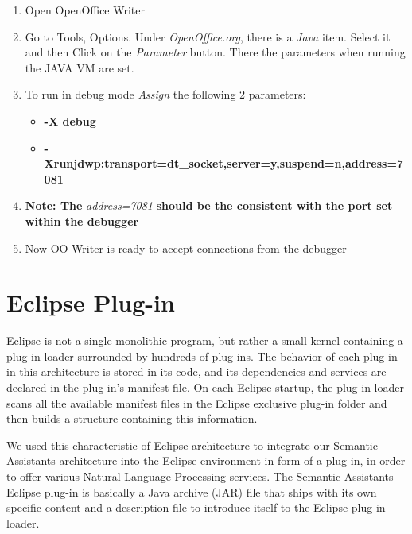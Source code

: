 \begin{enumerate}
  \item Open OpenOffice Writer
  \item Go to Tools, Options. Under \emph{OpenOffice.org}, there is a \emph{Java} item. Select it and then Click on the 
        \emph{Parameter} button. There the parameters when running the JAVA VM are set.
  \item To run in debug mode \emph{Assign} the following 2 parameters:
  \begin{itemize}
    \item \textbf{-X debug}
    \item \textbf{-Xrunjdwp:transport=dt\_socket,server=y,suspend=n,address=7081}
  \end{itemize}
  \item \textbf{Note: The} \emph{address=7081} \textbf{should be the consistent with the port set within the debugger}
  \item  Now OO Writer is ready to accept connections from the debugger
\end{enumerate} 


\section{Eclipse Plug-in}
Eclipse is not a single monolithic program, but rather a small kernel containing
a plug-in loader surrounded by hundreds of plug-ins. The behavior of each
plug-in in this architecture is stored in its code, and its dependencies and
services are declared in the plug-in's manifest file. On each Eclipse startup,
the plug-in loader scans all the available manifest files in the Eclipse
exclusive plug-in folder and then builds a structure containing this
information.

We used this characteristic of Eclipse architecture to integrate our Semantic
Assistants architecture into the Eclipse environment in form of a plug-in, in
order to offer various Natural Language Processing services. The Semantic
Assistants Eclipse plug-in is basically a Java archive (JAR) file that ships
with its own specific content and a description file to introduce itself to the
Eclipse plug-in loader. 

